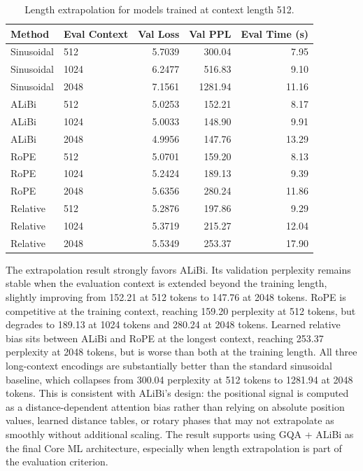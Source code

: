 \documentclass{article}
\begin{document}
\begin{table}[h]
\centering
\begin{tabular}{llrrr}
\toprule
Method & Eval Context & Val Loss & Val PPL & Eval Time (s) \\
\midrule
Sinusoidal & 512 & 5.7039 & 300.04 & 7.95 \\
Sinusoidal & 1024 & 6.2477 & 516.83 & 9.10 \\
Sinusoidal & 2048 & 7.1561 & 1281.94 & 11.16 \\
ALiBi & 512 & 5.0253 & 152.21 & 8.17 \\
ALiBi & 1024 & 5.0033 & 148.90 & 9.91 \\
ALiBi & 2048 & 4.9956 & 147.76 & 13.29 \\
RoPE & 512 & 5.0701 & 159.20 & 8.13 \\
RoPE & 1024 & 5.2424 & 189.13 & 9.39 \\
RoPE & 2048 & 5.6356 & 280.24 & 11.86 \\
Relative & 512 & 5.2876 & 197.86 & 9.29 \\
Relative & 1024 & 5.3719 & 215.27 & 12.04 \\
Relative & 2048 & 5.5349 & 253.37 & 17.90 \\
\bottomrule
\end{tabular}
\caption{Length extrapolation for models trained at context length 512.}
\end{table}

The extrapolation result strongly favors ALiBi. Its validation perplexity
remains stable when the evaluation context is extended beyond the training
length, slightly improving from 152.21 at 512 tokens to 147.76 at 2048 tokens.
RoPE is competitive at the training context, reaching 159.20 perplexity at 512
tokens, but degrades to 189.13 at 1024 tokens and 280.24 at 2048 tokens. Learned
relative bias sits between ALiBi and RoPE at the longest context, reaching
253.37 perplexity at 2048 tokens, but is worse than both at the training length.
All three long-context encodings are substantially better than the standard
sinusoidal baseline, which collapses from 300.04 perplexity at 512 tokens to
1281.94 at 2048 tokens. This is consistent with ALiBi's design: the positional
signal is computed as a distance-dependent attention bias rather than relying on
absolute position values, learned distance tables, or rotary phases that may not
extrapolate as smoothly without additional scaling. The result supports using
GQA + ALiBi as the final Core ML architecture, especially when length
extrapolation is part of the evaluation criterion.
\end{document}
